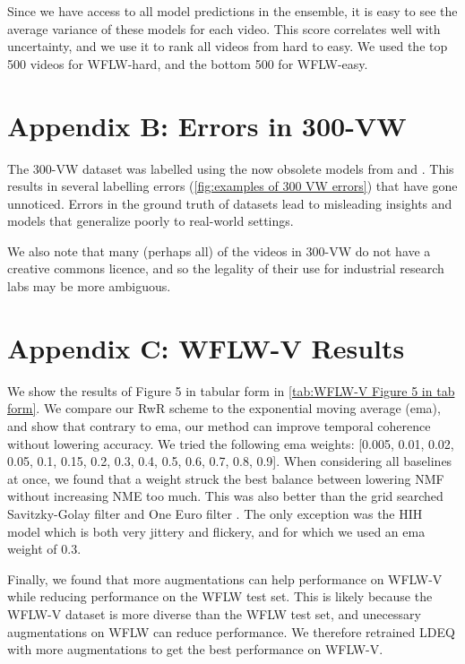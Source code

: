 \documentclass[10pt,twocolumn,letterpaper]{article}
\begin{document}
Since we have access to all  model predictions in the ensemble, it is easy to see the average variance of these models for each video. This score correlates well with uncertainty, and we use it to rank all videos from hard to easy. We used the top 500 videos for WFLW-hard, and the bottom 500 for WFLW-easy.

\section*{\large{Appendix B: Errors in 300-VW}}

The 300-VW dataset \cite{Shen2015FirstFacialLandmarkTracking} was labelled using the now obsolete models from \cite{Chrysos2015DeformableFaceTracking} and \cite{Tzimiropoulos2015ProjectOutCascadedRegression}. This results in several labelling errors (\cref{fig:examples of 300 VW errors}) that have gone unnoticed. Errors in the ground truth of datasets lead to misleading insights and models that generalize poorly to real-world settings. 

We also note that many (perhaps all) of the videos in 300-VW do not have a creative commons licence, and so the legality of their use for industrial research labs may be more ambiguous. 


\section*{\large{Appendix C: WFLW-V Results}}

We show the results of Figure 5 in tabular form in \cref{tab:WFLW-V Figure 5 in tab form}. We compare our RwR scheme to the exponential moving average (ema), and show that contrary to ema, our method can improve temporal coherence without lowering accuracy. We tried the following ema weights: [0.005, 0.01, 0.02, 0.05, 0.1, 0.15, 0.2, 0.3, 0.4, 0.5, 0.6, 0.7, 0.8, 0.9]. When considering all baselines at once, we found that a weight  struck the best balance between lowering NMF without increasing NME too much. This was also better than the grid searched Savitzky-Golay filter \cite{SavitzkyGolay1964Filter} and One Euro filter \cite{Casiez2012OneEuroFilter}. The only exception was the HIH model which is both very jittery and flickery, and for which we used an ema weight of 0.3.

Finally, we found that more augmentations can help performance on WFLW-V while reducing performance on the WFLW test set. This is likely because the WFLW-V dataset is more diverse than the WFLW test set, and unecessary augmentations on WFLW can reduce performance. We therefore retrained LDEQ with more augmentations to get the best performance on WFLW-V.
\end{document}
